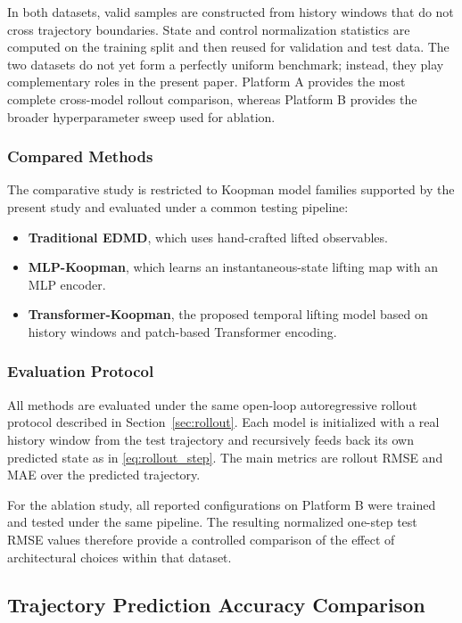 \documentclass[journal]{IEEEtran}
\begin{document}
In both datasets, valid samples are constructed from history windows that do not cross trajectory boundaries. State and control normalization statistics are computed on the training split and then reused for validation and test data. The two datasets do not yet form a perfectly uniform benchmark; instead, they play complementary roles in the present paper. Platform A provides the most complete cross-model rollout comparison, whereas Platform B provides the broader hyperparameter sweep used for ablation.

\subsubsection{Compared Methods}

The comparative study is restricted to Koopman model families supported by the present study and evaluated under a common testing pipeline:
\begin{itemize}
    \item \textbf{Traditional EDMD}, which uses hand-crafted lifted observables.
    \item \textbf{MLP-Koopman}, which learns an instantaneous-state lifting map with an MLP encoder.
    \item \textbf{Transformer-Koopman}, the proposed temporal lifting model based on history windows and patch-based Transformer encoding.
\end{itemize}

\subsubsection{Evaluation Protocol}

All methods are evaluated under the same open-loop autoregressive rollout protocol described in Section~\ref{sec:rollout}. Each model is initialized with a real history window from the test trajectory and recursively feeds back its own predicted state as in \eqref{eq:rollout_step}. The main metrics are rollout RMSE and MAE over the predicted trajectory.

For the ablation study, all reported configurations on Platform B were trained and tested under the same pipeline. The resulting normalized one-step test RMSE values therefore provide a controlled comparison of the effect of architectural choices within that dataset.

\subsection{Trajectory Prediction Accuracy Comparison}
\end{document}
